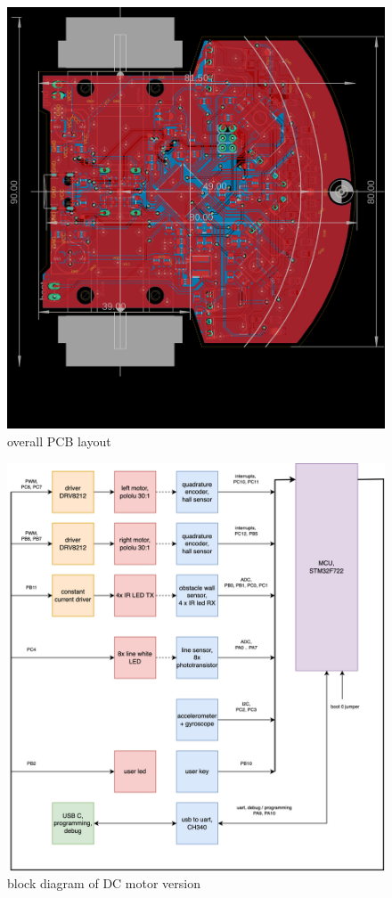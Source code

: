 \documentclass[12pt,twoside,onecolumn,openany,extrafontsizes,dvipsnames]{memoir}
\begin{document}
\begin{figure}[htb]
    \centering
    \includegraphics[scale=0.4]{../images/board_all.png}
    \caption{overall PCB layout}
\end{figure}


\newpage
\begin{figure}[h]
    \centering
    \includegraphics[scale=0.8]{../diagrams/diagrams-block_dc.png}
    \caption{block diagram of DC motor version}
\end{figure}
\end{document}
